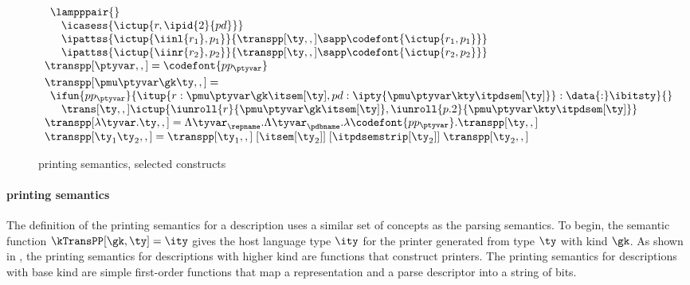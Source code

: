 \begin{figure}
\[\begin{array}{l}
  \begin{array}{l}  
  \lampppair{} \\
  \quad \icasess {\ictup{r,\ipid{2}{pd}}} \\
  \quad \ipattss{\ictup{\iinl{r_1}, p_1}} 
	{ {\transpp[\ty,,]} \sapp \codefont{\ictup{r_1,p_1}}}\\
  \quad \ipattss{\ictup{\iinr{r_2}, p_2}} 
	{ {\transpp[\ty,,]} \sapp \codefont{\ictup{r_2,p_2}}}\\
  \end{array}
\\[3pt]
\transpp[\ptyvar,,] = \codefont{pp_\ptyvar}
\\[3pt]
\transpp[\pmu \ptyvar \gk \ty,,] = \\
  \begin{array}{l}
  \ifun {pp_\ptyvar} {\itup{r:\pmu \ptyvar \gk \itsem[\ty], pd:\ipty{\pmu \ptyvar \kty \itpdsem[\ty]}}
                     : \data{:}\ibitsty} {}\\
  \quad \trans[\ty,,] \ictup{\iunroll{r}{\pmu \ptyvar \gk \itsem[\ty]},
     \iunroll{p.2}{\pmu \ptyvar \kty \itpdsem[\ty]}}
  \end{array}  
\\[3pt]
\transpp[\lambda\tyvar . \ty,,] = %
    \Lambda \tyvar_\repname. 
    \Lambda \tyvar_\pdbname. \lambda \codefont{pp_\ptyvar}. \transpp[\ty,,]
\\
\transpp[\ty_1 \ty_2,,] = 
    \transpp[\ty_1,,]\; [\itsem[\ty_2]]\; [\itpdsemstrip[\ty_2]]\; \transpp[\ty_2,,]
\\
\end{array}
\]
\caption{\ddc{} printing semantics, selected constructs}
\label{fig:ddc-print-sem}
\end{figure}


\paragraph*{\ddc{} printing semantics}
\label{sec:print-sem}
The definition of the printing semantics for a \ddc{} description
uses a similar set of concepts as the parsing semantics.  To begin,
the semantic function $\kTransPP[\gk,\ty] = \ity$ gives the
host language type $\ity$ for the printer generated from type $\ty$
with kind $\gk$.  As shown in ,
the printing semantics for descriptions with higher kind are functions that
construct printers.  The printing semantics for descriptions with base kind
are simple first-order functions that map a representation and a
parse descriptor into a string of bits.

